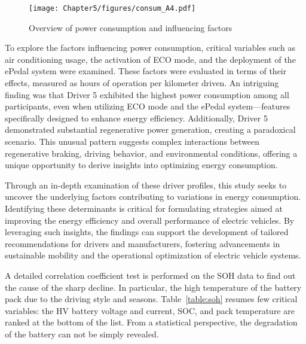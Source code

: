 
\begin{figure}[ht]
    \centering
    \texttt{[image: Chapter5/figures/consum\_A4.pdf]}
    \caption{Overview of power consumption and influencing factors}
    \label{fig:consumption}
\end{figure}

To explore the factors influencing power consumption, critical variables such as air conditioning usage, the activation of \gls{ECO} mode, and the deployment of the ePedal system were examined. 
These factors were evaluated in terms of their effects, measured as hours of operation per kilometer driven. 
An intriguing finding was that Driver 5 exhibited the highest power consumption among all participants, even when utilizing \gls{ECO} mode and the ePedal system—features specifically designed to enhance energy efficiency. 
Additionally, Driver 5 demonstrated substantial regenerative power generation, creating a paradoxical scenario. 
This unusual pattern suggests complex interactions between regenerative braking, driving behavior, and environmental conditions, offering a unique opportunity to derive insights into optimizing energy consumption.

Through an in-depth examination of these driver profiles, this study seeks to uncover the underlying factors contributing to variations in energy consumption. 
Identifying these determinants is critical for formulating strategies aimed at improving the energy efficiency and overall performance of electric vehicles. 
By leveraging such insights, the findings can support the development of tailored recommendations for drivers and manufacturers, fostering advancements in sustainable mobility and the operational optimization of electric vehicle systems.

A detailed correlation coefficient test is performed on the \gls{SOH} data to find out the cause of the sharp decline. 
In particular, the high temperature of the battery pack due to the driving style and seasons. 
Table~\ref{table:soh} resumes few critical variables: the \gls{HV} battery voltage and current, \gls{SOC}, and pack temperature are ranked at the bottom of the list. 
From a statistical perspective, the degradation of the battery can not be simply revealed. 


